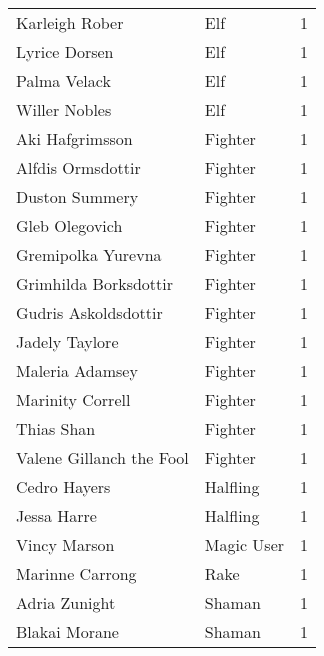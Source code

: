 \begin{tcolorbox}[breakable, title=Index by class]
\begin{supertabular}{p{0.6\columnwidth}lr}
Karleigh Rober                                     & Elf             &     1\\
Lyrice Dorsen                                      & Elf             &     1\\
Palma Velack                                       & Elf             &     1\\
Willer Nobles                                      & Elf             &     1\\
Aki Hafgrimsson                                    & Fighter         &     1\\
Alfdis Ormsdottir                                  & Fighter         &     1\\
Duston Summery                                     & Fighter         &     1\\
Gleb Olegovich                                     & Fighter         &     1\\
Gremipolka Yurevna                                 & Fighter         &     1\\
Grimhilda Borksdottir                              & Fighter         &     1\\
Gudris Askoldsdottir                               & Fighter         &     1\\
Jadely Taylore                                     & Fighter         &     1\\
Maleria Adamsey                                    & Fighter         &     1\\
Marinity Correll                                   & Fighter         &     1\\
Thias Shan                                         & Fighter         &     1\\
Valene Gillanch the Fool                           & Fighter         &     1\\
Cedro Hayers                                       & Halfling        &     1\\
Jessa Harre                                        & Halfling        &     1\\
Vincy Marson                                       & Magic User      &     1\\
Marinne Carrong                                    & Rake            &     1\\
Adria Zunight                                      & Shaman          &     1\\
Blakai Morane                                      & Shaman          &     1\\

\end{supertabular}
\end{tcolorbox}
